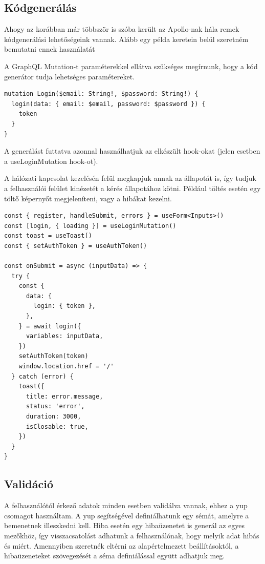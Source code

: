 \subsection{Kódgenerálás}

Ahogy az korábban már többször is szóba került az Apollo-nak hála remek kódgenerálási lehetőségeink vannak.
Alább egy példa keretein belül szeretném bemutatni ennek használatát

A GraphQL Mutation-t paraméterekkel ellátva szükséges megírnunk, hogy a kód generátor tudja lehetséges paramétereket. 
\begin{lstlisting}[style=ES6, caption={GraphQL Shield}]
mutation Login($email: String!, $password: String!) {
  login(data: { email: $email, password: $password }) {
    token
  }
}
\end{lstlisting}

A generálást futtatva azonnal használhatjuk az elkészült hook-okat (jelen esetben a useLoginMutation hook-ot).

A hálózati kapcsolat kezelésén felül megkapjuk annak az állapotát is, így tudjuk a felhasználói felület kinézetét a kérés állapotához kötni.
Például töltés esetén egy töltő képernyőt megjeleníteni, vagy a hibákat kezelni.

\begin{lstlisting}[style=ES6, caption={Bejelentkezés kódrészlet}]
const { register, handleSubmit, errors } = useForm<Inputs>()
const [login, { loading }] = useLoginMutation()
const toast = useToast()
const { setAuthToken } = useAuthToken()

const onSubmit = async (inputData) => {
  try {
    const {
      data: {
        login: { token },
      },
    } = await login({
      variables: inputData,
    })
    setAuthToken(token)
    window.location.href = '/'
  } catch (error) {
    toast({
      title: error.message,
      status: 'error',
      duration: 3000,
      isClosable: true,
    })
  }
}
\end{lstlisting}

\subsection{Validáció}
A felhasználótól érkező adatok minden esetben validálva vannak, ehhez a yup csomagot használtam.
A yup segítségével definiálhatunk egy sémát, amelyre a bemenetnek illeszkedni kell. 
Hiba esetén egy hibaüzenetet is generál az egyes mezőkhöz, így visszacsatolást adhatunk a felhasználónak, hogy melyik adat hibás és miért.
Amennyiben szeretnék eltérni az alapértelmezett beállításoktól, a hibaüzeneteket szövegezését a séma definiálással együtt adhatjuk meg.

